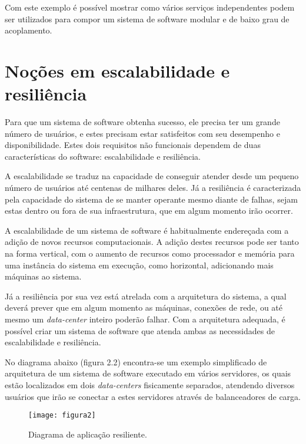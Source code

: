 Com este exemplo é possível mostrar como vários serviços independentes podem ser
utilizados para compor um sistema de software modular e de baixo grau de acoplamento.

\section{Noções em escalabilidade e resiliência}
\label{sec:nocoes-em-escalabilidade-e-resiliencia}

Para que um sistema de software obtenha sucesso, ele precisa ter um grande número de
usuários, e estes precisam estar satisfeitos com seu desempenho e disponibilidade.
Estes dois requisitos não funcionais dependem de duas características do software:
escalabilidade e resiliência.

A escalabilidade se traduz na capacidade de conseguir atender desde um pequeno
número de usuários até centenas de milhares deles. Já a resiliência é caracterizada
pela capacidade do sistema de se manter operante mesmo diante de falhas, sejam estas
dentro ou fora de sua infraestrutura, que em algum momento irão ocorrer.

A escalabilidade de um sistema de software é habitualmente endereçada com a adição
de novos recursos computacionais. A adição destes recursos pode ser tanto na forma
vertical, com o aumento de recursos como processador e memória para uma instância do
sistema em execução, como horizontal, adicionando mais máquinas ao sistema.

Já a resiliência por sua vez está atrelada com a arquitetura do sistema, a qual
deverá prever que em algum momento as máquinas, conexões de rede, ou até mesmo um
\textit{data-center} inteiro poderão falhar. Com a arquitetura adequada, é possível
criar um sistema de software que atenda ambas as necessidades de escalabilidade e
resiliência.

No diagrama abaixo (figura 2.2) encontra-se um exemplo simplificado de arquitetura de
um sistema de software executado em vários servidores, os quais estão localizados
em dois \textit{data-centers} fisicamente separados, atendendo diversos usuários que
irão se conectar a estes servidores através de balanceadores de carga.

\begin{figure}
  \centering
  \texttt{[image: figura2]}
  \caption{Diagrama de aplicação resiliente.\label{fig:diagrama-de-aplicacao-resiliente}}
\end{figure}


